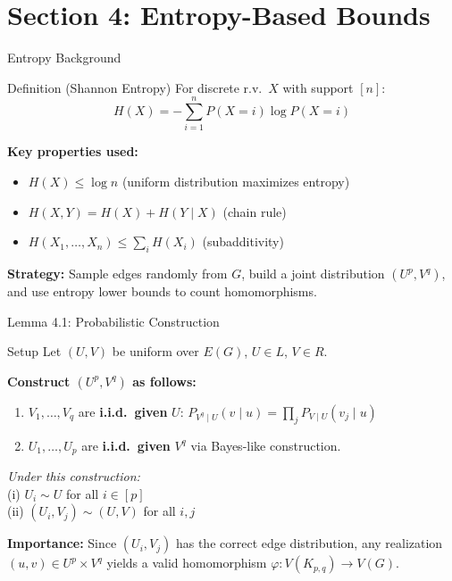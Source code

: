 \documentclass[aspectratio=169]{beamer}
\begin{document}
\section{Section 4: Entropy-Based Bounds}

\begin{frame}{Entropy Background}
  \begin{block}{Definition (Shannon Entropy)}
    For discrete r.v.\ $X$ with support $[n]$:
    \[
      H(X) = -\sum_{i=1}^{n} P(X=i) \log P(X=i)
    \]
  \end{block}

  \textbf{Key properties used:}
  \begin{itemize}
    \item $H(X) \leq \log n$ (uniform distribution maximizes entropy)
    \item $H(X,Y) = H(X) + H(Y \mid X)$ (chain rule)
    \item $H(X_1, \ldots, X_n) \leq \sum_i H(X_i)$ (subadditivity)
  \end{itemize}

  \textbf{Strategy:} Sample edges randomly from $G$, build a joint distribution $(U^p, V^q)$, and use entropy lower bounds to count homomorphisms.
\end{frame}

\begin{frame}{Lemma 4.1: Probabilistic Construction}
  \begin{block}{Setup}
    Let $(U,V)$ be uniform over $E(G)$, $U \in L$, $V \in R$.
  \end{block}

  \textbf{Construct $(U^p, V^q)$ as follows:}
  \begin{enumerate}
    \item $V_1, \ldots, V_q$ are \textbf{i.i.d.\ given} $U$: \quad
      $P_{V^q \mid U}(v \mid u) = \prod_j P_{V \mid U}(v_j \mid u)$
    \item $U_1, \ldots, U_p$ are \textbf{i.i.d.\ given} $V^q$ via Bayes-like construction.
  \end{enumerate}

  \begin{theorem}[Lemma 4.1]
    \textit{Under this construction:}\\[0.3em]
    \quad (i) $U_i \sim U$ for all $i \in [p]$\\
    \quad (ii) $(U_i, V_j) \sim (U,V)$ for all $i, j$
  \end{theorem}

  \textbf{Importance:} Since $(U_i, V_j)$ has the correct edge distribution, any realization
  $(u,v) \in U^p \times V^q$ yields a valid homomorphism $\varphi : V(K_{p,q}) \to V(G)$.
\end{frame}
\end{document}
